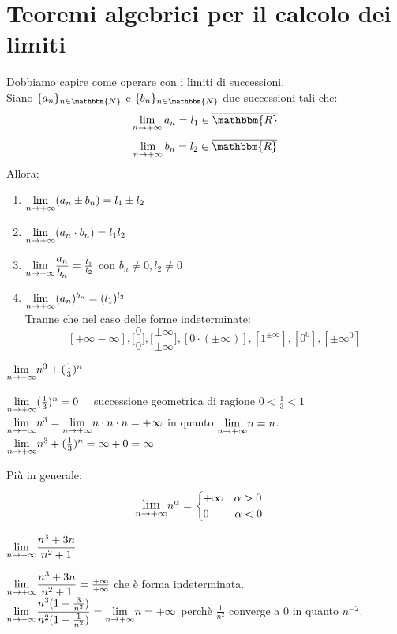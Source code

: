 \documentclass[12pt]{report}
\newcounter{exercise}
\begin{document}
	\section{Teoremi algebrici per il calcolo dei limiti}
	Dobbiamo capire come operare con i limiti di successioni. \\
	Siano $\{a_n\}_{n \in \mathbbm{N}}$ e $\{b_n\}_{n \in \mathbbm{N}}$ due successioni tali che:
	\[
	\lim_{n \to +\infty}a_n = l_1 \in \overline{\mathbbm{R}}
	\]
	\[
	\lim_{n \to +\infty}b_n = l_2 \in \overline{\mathbbm{R}}
	\]
	Allora:
	\begin{enumerate}
		\item $\mathlarger{\lim_{n \to +\infty}}(a_n \pm b_n) = l_1 \pm l_2$
		\item $\mathlarger{\lim_{n \to +\infty}}(a_n \cdot b_n) = l_1l_2$
		\item $\mathlarger{\lim_{n \to +\infty}}\dfrac{a_n}{b_n}=\frac{l_1}{l_2}$ con $b_n \neq 0, l_2 \neq 0$
		\item $\mathlarger{\lim_{n \to +\infty}}(a_n)^{b_n}=(l_1)^{l_2}$ \\
		Tranne che nel caso delle forme indeterminate:
		\[[+\infty -\infty], \biggl[\frac{0}{0}\biggr], \biggl[\frac{\pm\infty}{\pm\infty}\biggr], [0 \cdot (\pm \infty)], [1^{\pm\infty}], [0^0], [\pm\infty^0]\]
	\end{enumerate}
	\begin{assignment}{}{}
		$\mathlarger{\lim_{n \to +\infty}}n^3 + (\frac{1}{3})^n$
		\begin{exercise}{}{}
			$\mathlarger{\lim_{n \to +\infty}}(\frac{1}{3})^n = 0 \quad$ successione geometrica di ragione $0 < \frac{1}{3} < 1$ \\
			$\mathlarger{\lim_{n \to +\infty}}n^3=\mathlarger{\lim_{n \to +\infty}}n\cdot n \cdot n = +\infty$ in quanto $\mathlarger{\lim_{n \to +\infty}}n=n$. \\
			$\mathlarger{\lim_{n \to +\infty}}n^3+(\frac{1}{3})^n = \infty + 0 = \infty$
		\end{exercise}
	\end{assignment}
	Più in generale:
	\[
	\mathlarger{\lim_{n \to +\infty}}n^\alpha = \begin{cases}
		+\infty \quad \alpha > 0 \\
		0\phantom{\infty\ } \quad \alpha < 0
	\end{cases}
	\]
	\begin{assignment}{}{}
		$\mathlarger{\lim_{n \to +\infty}}\dfrac{n^3 + 3n}{n^2+1}$
		\begin{exercise}{}{}
			$\mathlarger{\lim_{n \to +\infty}}\dfrac{n^3+3n}{n^2+1}=\frac{+\infty}{+\infty}$ che è forma indeterminata. \\
			$\mathlarger{\lim_{n \to +\infty}}\dfrac{n^3(1+\frac{3}{n^2})}{n^2(1 + \frac{1}{n^2})} = \mathlarger{\lim_{n \to +\infty}}n=+\infty$ perchè $\frac{1}{n^2}$ converge a 0 in quanto $n^{-2}$.
		\end{exercise}
	\end{assignment}
\end{document}
